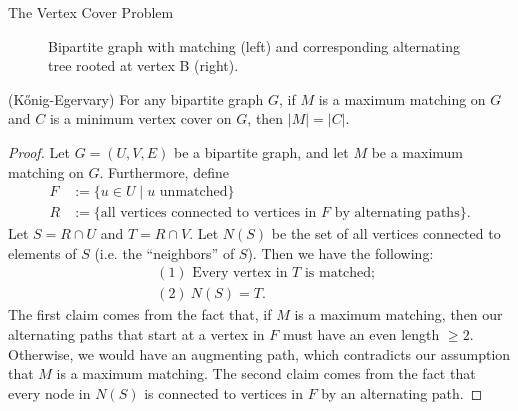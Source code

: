 \begin{section}{The Vertex Cover Problem}
\begin{figure}[h]
		\caption{Bipartite graph with matching (left) and corresponding alternating tree 
		rooted at vertex B (right).}
	\end{figure}

	\begin{theorem}{(K\H{o}nig-Egervary)}
		For any bipartite graph $G$, if $M$ is a maximum matching on $G$ and $C$ is a minimum 
		vertex cover  on $G$, then $|M| = |C|$.
	\end{theorem}
	\begin{proof}
		Let $G=(U,V,E)$ be a bipartite graph, and let $M$ be a maximum matching on $G$. 
		Furthermore, define
		\begin{align}
			F &:= \{u\in U\; |\; u \text{ unmatched}\}\\
			R &:= \{\text{all vertices connected to vertices in $F$ by alternating paths}\}.
		\end{align}
		Let $S = R\cap U$ and $T = R\cap V$. Let $N(S)$ be the set of all vertices 
		connected to elements of $S$ (i.e. the ``neighbors'' of $S$). Then we have the following:
		\begin{align*}
			&(1)\text{ Every vertex in $T$ is matched;}\\
			&(2)\ N(S) = T.
		\end{align*}
		The first claim comes from the fact that, if $M$ is a 
		maximum matching, then our alternating paths that start at a vertex in $F$ must have 
		an even length $\geq 2$. Otherwise, we would have an augmenting path, 
		which contradicts our assumption that $M$ is a maximum matching.
		The second claim comes from the fact that every node in $N(S)$ is connected to vertices 
		in $F$ by an alternating path. 


\end{proof}
\end{section}
